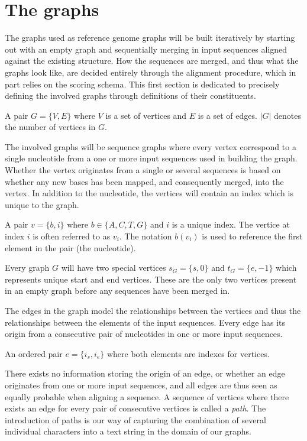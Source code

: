 \documentclass[thesis.tex]{subfiles}
\begin{document}
{\section{The graphs}
The graphs used as reference genome graphs will be built iteratively by starting out with an empty graph and sequentially merging in input sequences aligned against the existing structure. How the sequences are merged, and thus what the graphs look like, are decided entirely through the alignment procedure, which in part relies on the scoring schema. This first section is dedicated to precisely defining the involved graphs through definitions of their constituents. 
\clearpage
\begin{defn}
  A pair $G=\{V,E\}$ where $V$ is a set of vertices and $E$ is a set of edges. $|G|$ denotes the number of vertices in $G$.
\end{defn}
The involved graphs will be sequence graphs where every vertex correspond to a single nucleotide from a one or more input sequences used in building the graph. Whether the vertex originates from a single or several sequences is based on whether any new bases has been mapped, and consequently merged, into the vertex. In addition to the nucleotide, the vertices will contain an index which is unique to the graph. 
\begin{defn}
  A pair $v=\{b, i\}$ where $b \in \{A, C, T, G\}$ and $i$ is a unique index. The vertice at index $i$ is often referred to as $v_i$. The notation $b(v_i)$ is used to reference the first element in the pair (the nucleotide).
\end{defn}
Every graph $G$ will have two special vertices $s_G=\{s, 0\}$ and $t_G=\{e, -1\}$ which represents unique start and end vertices. These are the only two vertices present in an empty graph before any sequences have been merged in.\\
\par\noindent
The edges in the graph model the relationships between the vertices and thus the relationships between the elements of the input sequences. Every edge has its origin from a consecutive pair of nucleotides in one or more input sequences.
\begin{defn}
  An ordered pair $e=\{i_s, i_e\}$ where both elements are indexes for vertices. 
\end{defn}
There exists no information storing the origin of an edge, or whether an edge originates from one or more input sequences, and all edges are thus seen as equally probable when aligning a sequence. A sequence of vertices where there exists an edge for every pair of consecutive vertices is called a \textit{path}. The introduction of paths is our way of capturing the combination of several individual characters into a text string in the domain of our graphs.
}
\end{document}
